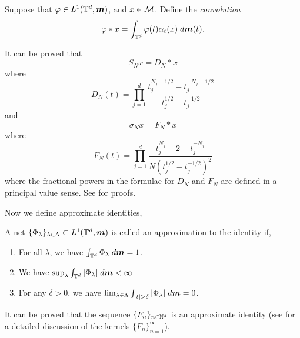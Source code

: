 \begin{definition}
    Suppose that $\varphi \in L^1(\mathbb{T}^d,\boldsymbol{m})$, and $x \in \mathcal{M}$. Define the \emph{convolution}
    \begin{equation}
        \varphi * x = \int_{\mathbb{T}^d} \varphi(t)\alpha_t(x)\;d\boldsymbol{m}(t).
    \end{equation}
\end{definition}

It can be proved that
\begin{equation}
    S_N x = D_N * x
\end{equation}
where 
\begin{equation}
    D_N(t) = \prod_{j=1}^d\frac{t_j^{N_j+1/2}-t_j^{-N_j-1/2}}{t_j^{1/2}-t_j^{-1/2}}
\end{equation}
and
\begin{equation}
    \sigma_N x = F_N*x
\end{equation}
where
\begin{equation}
    F_N(t) = \prod_{j=1}^d\frac{t_j^{N_j}-2+t_j^{-N_j}}{N(t_j^{1/2}-t_j^{-1/2})^2}
\end{equation}
where the fractional powers in the formulae for $D_N$ and $F_N$ are defined
in a principal value sense. See \cite{katznelson} for proofs.

Now we define approximate identities,
\begin{definition}
    A net $\{\Phi_\lambda\}_{\lambda \in \Lambda} \subset L^1(\mathbb{T}^d,\boldsymbol{m})$ is called
    an approximation to the identity if,
    \begin{enumerate}
        \item{} For all $\lambda$, we have $\int_{\mathbb{T}^d} \Phi_\lambda \;d\boldsymbol{m} = 1$.
        \item{} We have $\sup_{\lambda} \int_{\mathbb{T}^d} |\Phi_\lambda|\;d\boldsymbol{m} < \infty$
        \item{} For any $\delta > 0$, we have $\lim_{\lambda \in \Lambda} \int_{|t| > \delta} |\Phi_\lambda|\;d\boldsymbol{m} = 0$.
    \end{enumerate}
\end{definition}

It can be proved that the sequence $\{F_n\}_{n\in\mathbb{N}^d}$ is an approximate
identity (see \cite{Grafakos1} for a detailed discussion of the kernels $\{F_n\}_{n=1}^\infty$).

